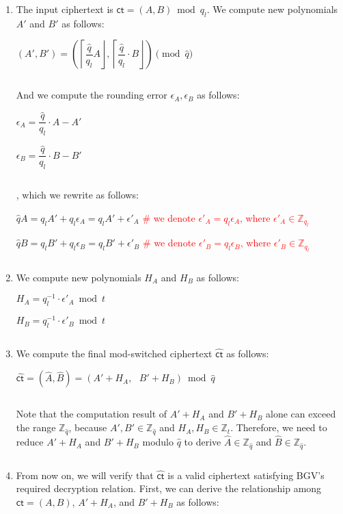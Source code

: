 \begin{enumerate}


\item The input ciphertext is $\textsf{ct} = (A, B) \bmod q_l$. We compute new polynomials $A'$ and $B'$ as follows:

$(A', B') = \left(\left\lceil\dfrac{\hat{q}}{q_l} A\right\rfloor, \left\lceil\dfrac{\hat{q}}{q_l}\cdot B\right\rfloor\right) \pmod{\hat{q}}$

$ $

And we compute the rounding error $\epsilon_A, \epsilon_B$ as follows: 

$\epsilon_A = \dfrac{\hat{q}}{q_l}\cdot A - A'$

$\epsilon_B = \dfrac{\hat{q}}{q_l}\cdot B - B'$


$ $

, which we rewrite as follows:

$\hat{q} A = q_{l} A' + q_{l}\epsilon_A = q_{l} A' + \epsilon'_A$ \textcolor{red}{ \# we denote $\epsilon'_A = q_{l}\epsilon_A$, where $\epsilon'_A \in \mathbb{Z}_{q_l}$}

$\hat{q} B = q_{l} B' + q_{l}\epsilon_B = q_{l} B' + \epsilon'_B$ \textcolor{red}{ \# we denote $\epsilon'_B = q_{l}\epsilon_B$, where $\epsilon'_B \in \mathbb{Z}_{q_l}$}

$ $

\item We compute new polynomials $H_A$ and $H_B$ as follows:

$H_A = q_l^{-1}\cdot\epsilon'_A \bmod t$

$H_B = q_l^{-1}\cdot\epsilon'_B \bmod t$

$ $

\item We compute the final mod-switched ciphertext $\hat{\textsf{ct}}$ as follows:

$\hat{\textsf{ct}} = (\hat{A}, \hat{B}) = (A' + H_A, \text{ } B' + H_B) \bmod \hat{q}$

$ $

Note that the computation result of $A' + H_A$ and $B' + H_B$ alone can exceed the range $\mathbb{Z}_{\hat{q}}$, because $A', B' \in \mathbb{Z}_{\hat{q}}$ and $H_A, H_B \in \mathbb{Z}_t$. Therefore, we need to reduce $A' + H_A$ and $B' + H_B$ modulo $\hat{q}$  to derive $\hat{A} \in \mathbb{Z}_{\hat{q}}$ and $\hat{B} \in \mathbb{Z}_{\hat{q}}$. 

$ $

\item From now on, we will verify that $\hat{\textsf{ct}}$ is a valid ciphertext satisfying BGV's required decryption relation. First, we can derive the relationship among $\textsf{ct} = (A, B)$, $A' + H_A$, and $B' + H_B$ as follows:


\end{enumerate}
